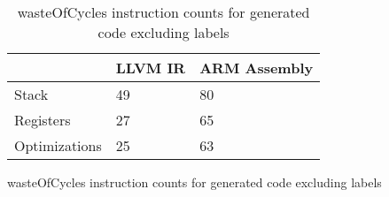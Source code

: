 \begin{table}[h!]
\centering
\begin{tabular}{p{}p{}p{}}
  \hline
 & LLVM IR & ARM Assembly \\ 
  \hline
Stack &  49 &  80 \\ 
  Registers &  27 &  65 \\ 
  Optimizations &  25 &  63 \\ 
   \hline
\end{tabular}
\caption{wasteOfCycles instruction counts for generated code excluding labels}
\caption{wasteOfCycles instruction counts for generated code excluding labels}
\end{table}

